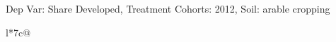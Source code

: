 \begin{table}[H]
\captionlistentry[table]{}
\label{table:beaver_land_class_DVis_land_class_3_SCg1_SSAC}
\scriptsize %
Dep Var: Share Developed, Treatment Cohorts: 2012, Soil: arable cropping \\
\begin{threeparttable}
\begin{tabulary}{\textwidth}{l*{7}{c}@{}}
\toprule \toprule
\noalign{\smallskip}
\noalign{\smallskip}
\midrule \bottomrule
\end{tabulary}
\medskip
\end{threeparttable}
\end{table}
